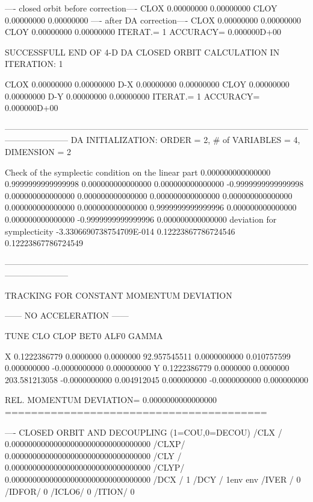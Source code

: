 \begin{ctverbatim}
---- closed orbit before correction----
 CLOX    0.00000000       0.00000000
 CLOY    0.00000000       0.00000000
---- after DA correction----
 CLOX    0.00000000       0.00000000
 CLOY    0.00000000       0.00000000
 ITERAT.=  1 ACCURACY= 0.000000D+00

SUCCESSFULL END OF 4-D DA CLOSED ORBIT CALCULATION IN ITERATION:    1

 CLOX    0.00000000       0.00000000
  D-X    0.00000000       0.00000000
 CLOY    0.00000000       0.00000000
  D-Y    0.00000000       0.00000000
 ITERAT.=  1 ACCURACY= 0.000000D+00


-----------------------------------------------------------------------------------------------------------------------------------
     DA INITIALIZATION: ORDER =  2, # of VARIABLES =  4, DIMENSION =  2

Check of the symplectic condition on the linear part
0.000000000000000       0.9999999999999998        0.000000000000000        0.000000000000000
-0.9999999999999998        0.000000000000000        0.000000000000000        0.000000000000000
0.000000000000000        0.000000000000000        0.000000000000000       0.9999999999999996
0.000000000000000        0.000000000000000      -0.9999999999999996        0.000000000000000
deviation for symplecticity   -3.3306690738754709E-014  %
0.12223867786724546       0.12223867786724549

-----------------------------------------------------------------------------------------------------------------------------------

    TRACKING FOR CONSTANT MOMENTUM DEVIATION

          ------ NO ACCELERATION ------

                TUNE         CLO            CLOP              BET0           ALF0           GAMMA

      X    0.1222386779   0.0000000       0.0000000        92.957545511    0.0000000000    0.010757599
                                                            0.000000000   -0.0000000000    0.000000000
      Y    0.1222386779   0.0000000       0.0000000       203.581213058   -0.0000000000    0.004912045
                                                            0.000000000   -0.0000000000    0.000000000


    REL. MOMENTUM DEVIATION= 0.0000000000000000
  ========================================

---- CLOSED ORBIT AND DECOUPLING (1=COU,0=DECOU)
/CLX /            0.000000000000000000000000000000000
/CLXP/            0.000000000000000000000000000000000
/CLY /            0.000000000000000000000000000000000
/CLYP/            0.000000000000000000000000000000000
/DCX /    1
/DCY /    1env
env
/IVER /   0
/IDFOR/   0
/ICLO6/   0
/ITION/   0
\end{ctverbatim}

